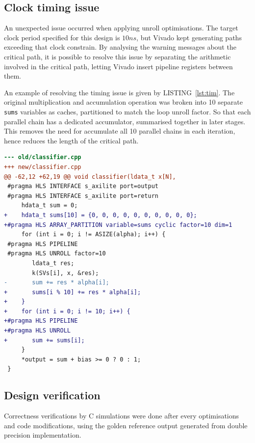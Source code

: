 \documentclass[journal]{IEEEtran}
\newcommand{\lref}[1]{LISTING~\ref{#1}}
\newcommand{\improvi}[1]{\improv[inline]{#1}}
\begin{document}
\improvi{Insert codes?}

\subsection{Clock timing issue}

An unexpected issue occurred when applying unroll optimisations. The target clock period specified for this design is $10 ns$, but Vivado kept generating paths exceeding that clock constrain. By analysing the warning messages about the critical path, it is possible to resolve this issue by separating the arithmetic involved in the critical path, letting Vivado insert pipeline registers between them.

An example of resolving the timing issue is given by \lref{lst:tim}. The original multiplication and accumulation operation was broken into 10 separate \texttt{sums} variables as caches, partitioned to match the loop unroll factor. So that each parallel chain has a dedicated accumulator, summarised together in later stages. This removes the need for accumulate all 10 parallel chains in each iteration, hence reduces the length of the critical path.

\begin{lstlisting}[language=diff,caption={Code modification to resolve timing issue},captionpos=b,label=lst:tim]
--- old/classifier.cpp
+++ new/classifier.cpp
@@ -62,12 +62,19 @@ void classifier(ldata_t x[N],
 #pragma HLS INTERFACE s_axilite port=output
 #pragma HLS INTERFACE s_axilite port=return
     hdata_t sum = 0;
+    hdata_t sums[10] = {0, 0, 0, 0, 0, 0, 0, 0, 0, 0};
+#pragma HLS ARRAY_PARTITION variable=sums cyclic factor=10 dim=1
     for (int i = 0; i != ASIZE(alpha); i++) {
 #pragma HLS PIPELINE
 #pragma HLS UNROLL factor=10
        ldata_t res;
        k(SVs[i], x, &res);
-       sum += res * alpha[i];
+       sums[i % 10] += res * alpha[i];
+    }
+    for (int i = 0; i != 10; i++) {
+#pragma HLS PIPELINE
+#pragma HLS UNROLL
+       sum += sums[i];
     }
     *output = sum + bias >= 0 ? 0 : 1;
 }
\end{lstlisting}

\subsection{Design verification}

Correctness verifications by C simulations were done after every optimisations and code modifications, using the golden reference output generated from double precision implementation.
\end{document}
